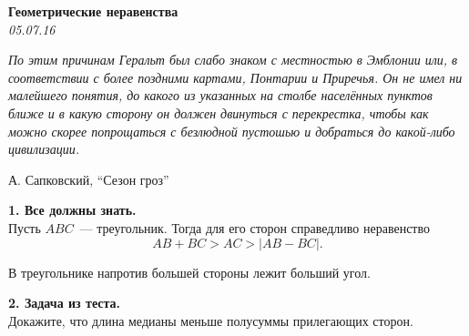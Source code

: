 \begin{center}
\textbf{\Large Геометрические неравенства}\\
\textit{05.07.16}
\end{center}
\epigraph{\textit{По этим причинам Геральт был слабо знаком с местностью в Эмблонии или, в соответствии с более поздними картами, Понтарии и Приречья. Он не имел ни малейшего понятия, до какого из указанных на столбе населённых пунктов ближе и в какую сторону он должен двинуться с перекрестка, чтобы как можно скорее попрощаться с безлюдной пустошью и добраться до какой-либо цивилизации.}}{А. Сапковский, ``Сезон гроз''}

{\bf 1. Все должны знать.} \\
Пусть  $ABC$~--- треугольник. Тогда для его сторон справедливо неравенство $$AB+BC > AC >|AB-BC|.$$

В треугольнике напротив большей стороны лежит больший угол.

{\bf 2. Задача из теста.}\\
Докажите, что длина медианы меньше полусуммы прилегающих сторон.

